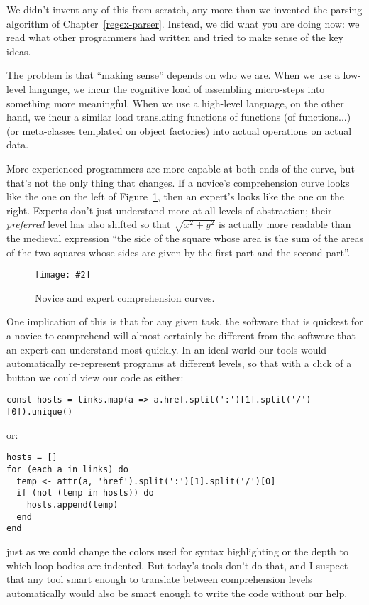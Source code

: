 \documentclass[krantzl]{krantz}
\newcommand{\figpdf}[4]{\begin{figure}%
\centering%
\texttt{[image: \#2]}%
\caption{#3}%
\label{#1}%
\end{figure}}
\newcommand{\chapref}[1]{Chapter~\ref{#1}}
\newcommand{\figref}[1]{Figure~\ref{#1}}
\begin{document}
We didn’t invent any of this from scratch,
any more than we invented the parsing algorithm of \chapref{regex-parser}.
Instead,
we did what you are doing now:
we read what other programmers had written
and tried to make sense of the key ideas.


The problem is that “making sense” depends on who we are.
When we use a low-level language,
we incur the cognitive load of assembling micro-steps into something more meaningful.
When we use a high-level language,
on the other hand,
we incur a similar load translating functions of functions (of functions...)
(or meta-classes templated on object factories)
into actual operations on actual data.


More experienced programmers are more capable at both ends of the curve,
but that’s not the only thing that changes.
If a novice’s comprehension curve looks like the one on the left
of \figref{page-templates-comprehension},
then an expert’s looks like the one on the right.
Experts don’t just understand more at all levels of abstraction;
their \emph{preferred} level has also shifted
so that $\sqrt{x^2 + y^2}$
is actually more readable than the medieval expression
“the side of the square whose area is the sum of the areas of the two squares
whose sides are given by the first part and the second part”.

\figpdf{page-templates-comprehension}{./page-templates/comprehension.pdf}{Novice and expert comprehension curves.}{0.6}


One implication of this is that for any given task,
the software that is quickest for a novice to comprehend
will almost certainly be different from the software that
an expert can understand most quickly.
In an ideal world our tools would automatically re-represent programs at different levels,
so that with a click of a button we could view our code as either:

\begin{lstlisting}[frame=tblr]
const hosts = links.map(a => a.href.split(':')[1].split('/')[0]).unique()
\end{lstlisting}


or:

\begin{lstlisting}[frame=tblr]
hosts = []
for (each a in links) do
  temp <- attr(a, 'href').split(':')[1].split('/')[0]
  if (not (temp in hosts)) do
    hosts.append(temp)
  end
end
\end{lstlisting}


\noindent just as we could change the colors used for syntax highlighting
or the depth to which loop bodies are indented.
But today’s tools don’t do that,
and I suspect that any tool smart enough to translate between comprehension levels automatically
would also be smart enough to write the code without our help.
\end{document}
